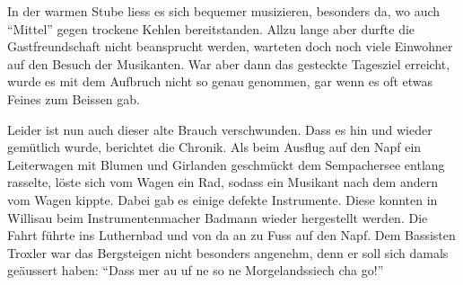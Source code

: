 \begin{history}
    In der warmen Stube liess es sich bequemer musizieren, besonders da, wo auch
    \enquote{Mittel} gegen trockene Kehlen bereitstanden. Allzu lange aber durfte die
    Gastfreundschaft nicht beansprucht werden, warteten doch noch viele
    Einwohner auf den Besuch der Musikanten. War aber dann das gesteckte
    Tagesziel erreicht, wurde es mit dem Aufbruch nicht so genau genommen, gar
    wenn es oft etwas Feines zum Beissen gab.

    Leider ist nun auch dieser alte Brauch verschwunden. Dass es hin und wieder
    gemütlich wurde, berichtet die Chronik. Als beim Ausflug auf den Napf ein
    Leiterwagen mit Blumen und Girlanden geschmückt dem Sempachersee entlang
    rasselte, löste sich vom Wagen ein Rad, sodass ein Musikant nach dem andern
    vom Wagen kippte. Dabei gab es einige defekte Instrumente. Diese konnten in
    Willisau beim Instrumentenmacher Badmann wieder hergestellt werden. Die
    Fahrt führte ins Luthernbad und von da an zu Fuss auf den Napf. Dem
    Bassisten Troxler war das Bergsteigen nicht besonders angenehm, denn er soll
    sich damals geäussert haben: \enquote{Dass mer au uf ne so ne Morgelandssiech cha
        go!}


\end{history}
